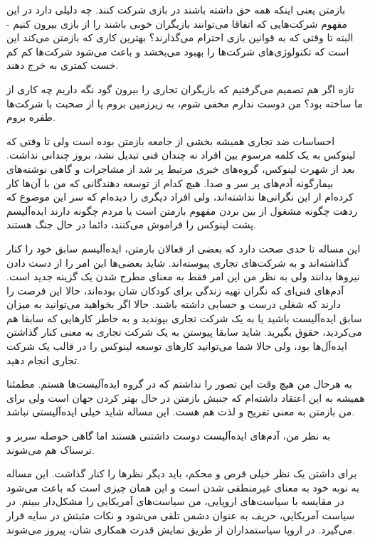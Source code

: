 بازمتن یعنی اینکه همه حق داشته باشند در بازی شرکت کنند. چه دلیلی دارد
در این مفهوم شرکت‌هایی که اتفاقا می‌توانند بازیگران خوبی باشند را از
بازی بیرون کنیم - البته تا وقتی که به قوانین بازی احترام می‌گذارند؟
بهترین کاری که بازمتن می‌کند این است که تکنولوژی‌های شرکت‌ها را بهبود
می‌بخشد و باعث می‌شود شرکت‌ها کم کم خست کمتری به خرج دهند.

تازه اگر هم تصمیم می‌گرفتیم که بازیگران تجاری را بیرون گود نگه داریم چه
کاری از ما ساخته بود؟ من دوست ندارم مخفی شوم، به زیرزمین بروم یا از
صحبت با شرکت‌ها طفره بروم.

احساسات ضد تجاری همیشه بخشی از جامعه بازمتن بوده است ولی تا وقتی که
لینوکس به یک کلمه مرسوم بین افراد نه چندان فنی تبدیل نشد، بروز چندانی
نداشت. بعد از شهرت لینوکس، گروه‌های خبری مرتبط پر شد از مشاجرات و گاهی
نوشته‌های بیمارگونه آدم‌های پر سر و صدا. هیچ کدام از توسعه دهندگانی که
من با آن‌ها کار کرده‌ام از این نگرانی‌ها نداشته‌اند، ولی افراد دیگری را
دیده‌ام که سر این موضوع که ردهت چگونه مشغول از بین بردن مفهوم بازمتن
است یا مردم چگونه دارند ایده‌آلیسم پشت لینوکس را فراموش می‌کنند، دائما
در حال جنگ هستند.

این مساله تا حدی صحت دارد که بعضی از فعالان بازمتن، ایده‌آلیسم سابق خود
را کنار گذاشته‌اند و به شرکت‌های تجاری پیوسته‌اند. شاید بعضی‌ها این امر را
از دست دادن نیروها بدانند ولی به نظر من این امر فقط به معنای مطرح شدن
یک گزینه جدید است. آدم‌های فنی‌ای که نگران تهیه زندگی برای کودکان شان
بوده‌اند، حالا این فرصت را دارند که شغلی درست و حسابی داشته باشند. حالا
اگر بخواهید می‌توانید به میزان سابق ایده‌آلیست باشید یا به یک شرکت تجاری
بپوندید و به خاطر کارهایی که سابقا هم می‌کردید، حقوق بگیرید. شاید سابقا
پیوستن به یک شرکت تجاری به معنی کنار گذاشتن ایده‌آل‌ها بود، ولی حالا شما
می‌توانید کارهای توسعه لینوکس را در قالب یک شرکت تجاری انجام دهید.

به هرحال من هیچ وقت این تصور را نداشتم که در گروه ایده‌آلیست‌ها
هستم. مطمئنا همیشه به این اعتقاد داشته‌ام که جنبش بازمتن در حال بهتر
کردن جهان است ولی برای من بازمتن به معنی تفریح و لذت هم هست. این مساله
شاید خیلی ایده‌آلیستی نباشد.

به نظر من، آدم‌های ایده‌آلیست دوست داشتنی هستند اما گاهی حوصله سربر و
ترسناک هم می‌شوند.

برای داشتن یک نظر خیلی قرص و محکم، باید دیگر نظرها را کنار گذاشت. این
مساله به نوبه خود به معنای غیرمنطقی شدن است و این همان چیزی است که
باعث می‌شود در مقایسه با سیاست‌های اروپایی، من سیاست‌های آمریکایی را
مشکل‌دار ببینم. در سیاست آمریکایی، حریف به عنوان دشمن تلقی می‌شود و نکات
مثبتش در سایه قرار می‌گیرد. در اروپا سیاستمداران از طریق نمایش قدرت
همکاری شان، پیروز می‌شوند.

